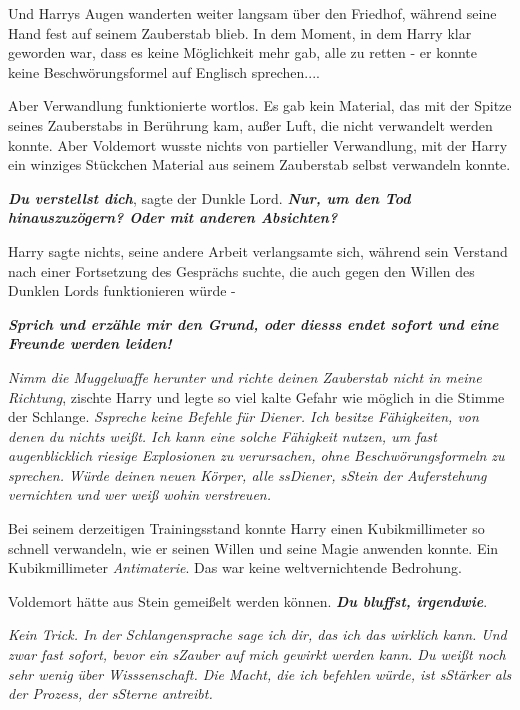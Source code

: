 Und Harrys Augen wanderten weiter langsam über den Friedhof, während seine Hand
fest auf seinem Zauberstab blieb. In dem Moment, in dem Harry klar geworden war,
dass es keine Möglichkeit mehr gab, alle zu retten - er konnte keine
Beschwörungsformel auf Englisch sprechen....

Aber Verwandlung funktionierte wortlos. Es gab kein Material, das mit der Spitze
seines Zauberstabs in Berührung kam, außer Luft, die nicht verwandelt werden
konnte. Aber Voldemort wusste nichts von partieller Verwandlung, mit der Harry
ein winziges Stückchen Material aus seinem Zauberstab selbst verwandeln konnte.

\glqq{}\textbf{\emph{Du verstellst dich}}\grqq{}, sagte der Dunkle Lord. \glqq{}
\textbf{\emph{Nur, um den Tod hinauszuzögern? Oder mit anderen Absichten?}}\grqq{}

Harry sagte nichts, seine andere Arbeit verlangsamte sich, während sein Verstand
nach einer Fortsetzung des Gesprächs suchte, die auch gegen den Willen des
Dunklen Lords funktionieren würde -

\glqq{}\textbf{\emph{Sprich und erzähle mir den Grund, oder diesss endet sofort
und eine Freunde werden leiden!}}\grqq{}

\glqq{}\emph{Nimm die Muggelwaffe herunter und richte deinen Zauberstab nicht in
meine Richtung}\grqq{}, zischte Harry und legte so viel kalte Gefahr wie möglich
in die Stimme der Schlange. \glqq{}\emph{Sspreche keine Befehle für Diener. Ich
besitze Fähigkeiten, von denen du nichts weißt. Ich kann eine solche Fähigkeit
nutzen, um fast augenblicklich riesige Explosionen zu verursachen, ohne
Beschwörungsformeln zu sprechen. Würde deinen neuen Körper, alle ssDiener,
sStein der Auferstehung vernichten und wer weiß wohin verstreuen.}\grqq{}

Bei seinem derzeitigen Trainingsstand konnte Harry einen Kubikmillimeter so
schnell verwandeln, wie er seinen Willen und seine Magie anwenden konnte. Ein
Kubikmillimeter \emph{Antimaterie}. Das war keine weltvernichtende Bedrohung.

Voldemort hätte aus Stein gemeißelt werden können. \glqq{}\textbf{\emph{Du
bluffst, irgendwie}}.\grqq{}

\glqq{}\emph{Kein Trick. In der Schlangensprache sage ich dir, das ich das
wirklich kann. Und zwar fast sofort, bevor ein sZauber auf mich gewirkt werden
kann. Du weißt noch sehr wenig über Wisssenschaft. Die Macht, die ich befehlen
würde, ist sStärker als der Prozess, der sSterne antreibt.}\grqq{}

